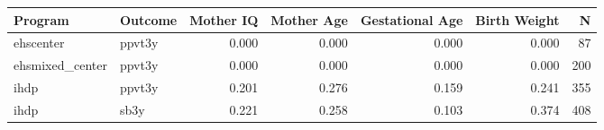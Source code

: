 \begin{table}[ht]
\centering
\begin{tabular}{llrrrrr}
  \hline
Program & Outcome & Mother IQ & Mother Age & Gestational Age & Birth Weight & N \\ 
  \hline
ehscenter & ppvt3y & 0.000 & 0.000 & 0.000 & 0.000 & 87 \\ 
  ehsmixed\_center & ppvt3y & 0.000 & 0.000 & 0.000 & 0.000 & 200 \\ 
  ihdp & ppvt3y & 0.201 & 0.276 & 0.159 & 0.241 & 355 \\ 
  ihdp & sb3y & 0.221 & 0.258 & 0.103 & 0.374 & 408 \\ 
   \hline
\end{tabular}
\end{table}
